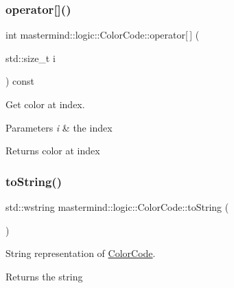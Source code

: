 \subsubsection{\texorpdfstring{operator[]()}{operator[]()}}
{\footnotesize\ttfamily int mastermind\+::logic\+::\+Color\+Code\+::operator\mbox{[}$\,$\mbox{]} (\begin{DoxyParamCaption}\item[{std\+::size\+\_\+t}]{i }\end{DoxyParamCaption}) const}



Get color at index. 


\begin{DoxyParams}{Parameters}
{\em i} & the index \\
\hline
\end{DoxyParams}
\begin{DoxyReturn}{Returns}
color at index 
\end{DoxyReturn}
\hypertarget{classmastermind_1_1logic_1_1_color_code_acba1d8df3a2a5b4907009c7d21cbd723}{}\label{classmastermind_1_1logic_1_1_color_code_acba1d8df3a2a5b4907009c7d21cbd723} 
\subsubsection{\texorpdfstring{to\+String()}{toString()}\hspace{0.1cm}{\footnotesize\ttfamily [1/2]}}
{\footnotesize\ttfamily std\+::wstring mastermind\+::logic\+::\+Color\+Code\+::to\+String (\begin{DoxyParamCaption}{ }\end{DoxyParamCaption})\hspace{0.3cm}{\ttfamily [virtual]}}



String representation of \hyperlink{classmastermind_1_1logic_1_1_color_code}{Color\+Code}. 

\begin{DoxyReturn}{Returns}
the string 
\end{DoxyReturn}
\hypertarget{classmastermind_1_1logic_1_1_color_code_a5d3903d505ecbd831d7e3776a0076c51}{}\label{classmastermind_1_1logic_1_1_color_code_a5d3903d505ecbd831d7e3776a0076c51} 
